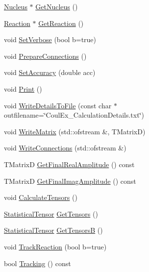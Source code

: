 \begin{DoxyCompactItemize}
\item 
\hyperlink{classNucleus}{Nucleus} $\ast$ \hyperlink{classPointCoulEx_a0190b4e42074c4198e80f3403d25b14e}{Get\-Nucleus} ()
\item 
\hyperlink{classReaction}{Reaction} $\ast$ \hyperlink{classPointCoulEx_a4369d10a2ab275ffd79800f4b2946345}{Get\-Reaction} ()
\item 
void \hyperlink{classPointCoulEx_afd63f7b47fc6fb5f49906911cb212b38}{Set\-Verbose} (bool b=true)
\item 
void \hyperlink{classPointCoulEx_a1bfa7f85286b1da3c4f0622ee35d0087}{Prepare\-Connections} ()
\item 
void \hyperlink{classPointCoulEx_a80b13791f6bfd42e2ab75895e1617ee3}{Set\-Accuracy} (double acc)
\item 
void \hyperlink{classPointCoulEx_aa6006da1bca6a0bc677c4fb23ba38dcd}{Print} ()
\item 
void \hyperlink{classPointCoulEx_a409e44329209abf7d2e4bfc794b2bb1e}{Write\-Details\-To\-File} (const char $\ast$outfilename=\char`\"{}Coul\-Ex\-\_\-\-Calculation\-Details.\-txt\char`\"{})
\item 
void \hyperlink{classPointCoulEx_aa7fa9cd089c327c59eef9ec4e7f46e0e}{Write\-Matrix} (std\-::ofstream \&, T\-Matrix\-D)
\item 
void \hyperlink{classPointCoulEx_a8786b398bd1d6d790f203c87cef957cc}{Write\-Connections} (std\-::ofstream \&)
\item 
T\-Matrix\-D \hyperlink{classPointCoulEx_aa53de9a5ae2bd43ef3b3287cffaccc67}{Get\-Final\-Real\-Amplitude} () const 
\item 
T\-Matrix\-D \hyperlink{classPointCoulEx_a13792d4d252f16cd4c1bb881757dea30}{Get\-Final\-Imag\-Amplitude} () const 
\item 
void \hyperlink{classPointCoulEx_a276ea0591ad200fbd40a53ac80c61634}{Calculate\-Tensors} ()
\item 
\hyperlink{classStatisticalTensor}{Statistical\-Tensor} \hyperlink{classPointCoulEx_a08232c7aba802b4820dc3859bf183a2e}{Get\-Tensors} ()
\item 
\hyperlink{classStatisticalTensor}{Statistical\-Tensor} \hyperlink{classPointCoulEx_af4dca3329edc2696b088140eceef5bda}{Get\-Tensors\-B} ()
\item 
void \hyperlink{classPointCoulEx_aa03b7b60a372846b772659ff1b16c246}{Track\-Reaction} (bool b=true)
\item 
bool \hyperlink{classPointCoulEx_a65c1db61988871c76583e54d52b721ec}{Tracking} () const 
\item 

\end{DoxyCompactItemize}
